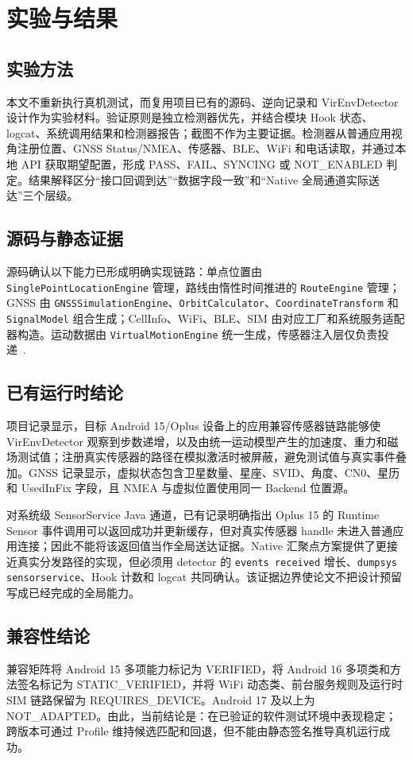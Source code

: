\section{实验与结果}
\subsection{实验方法}
本文不重新执行真机测试，而复用项目已有的源码、逆向记录和 VirEnvDetector~\citep{virenvdetector} 设计作为实验材料。验证原则是独立检测器优先，并结合模块 Hook 状态、logcat、系统调用结果和检测器报告；截图不作为主要证据。检测器从普通应用视角注册位置、GNSS Status/NMEA、传感器、BLE、WiFi 和电话读取，并通过本地 API 获取期望配置，形成 PASS、FAIL、SYNCING 或 NOT\_ENABLED 判定。结果解释区分“接口回调到达”“数据字段一致”和“Native 全局通道实际送达”三个层级。

\subsection{源码与静态证据}
源码确认以下能力已形成明确实现链路：单点位置由 \texttt{SinglePointLocationEngine} 管理，路线由惰性时间推进的 \texttt{RouteEngine} 管理；GNSS 由 \texttt{GNSSSimulationEngine}、\texttt{OrbitCalculator}、\texttt{CoordinateTransform} 和 \texttt{SignalModel} 组合生成；CellInfo、WiFi、BLE、SIM 由对应工厂和系统服务适配器构造。运动数据由 \texttt{VirtualMotionEngine} 统一生成，传感器注入层仅负责投递~\citep{zhangvirtualenv}.

\subsection{已有运行时结论}
项目记录显示，目标 Android 15/Oplus 设备上的应用兼容传感器链路能够使 VirEnvDetector 观察到步数递增，以及由统一运动模型产生的加速度、重力和磁场测试值；注册真实传感器的路径在模拟激活时被屏蔽，避免测试值与真实事件叠加。GNSS 记录显示，虚拟状态包含卫星数量、星座、SVID、角度、CN0、星历和 UsedInFix 字段，且 NMEA 与虚拟位置使用同一 Backend 位置源。

对系统级 SensorService Java 通道，已有记录明确指出 Oplus 15 的 Runtime Sensor 事件调用可以返回成功并更新缓存，但对真实传感器 handle 未进入普通应用连接；因此不能将该返回值当作全局送达证据。Native 汇聚点方案提供了更接近真实分发路径的实现，但必须用 detector 的 \texttt{events received} 增长、\texttt{dumpsys sensorservice}、Hook 计数和 logcat 共同确认。该证据边界使论文不把设计预留写成已经完成的全局能力。

\subsection{兼容性结论}
兼容矩阵将 Android 15 多项能力标记为 VERIFIED，将 Android 16 多项类和方法签名标记为 STATIC\_VERIFIED，并将 WiFi 动态类、前台服务规则及运行时 SIM 链路保留为 REQUIRES\_DEVICE。Android 17 及以上为 NOT\_ADAPTED。由此，当前结论是：在已验证的软件测试环境中表现稳定；跨版本可通过 Profile 维持候选匹配和回退，但不能由静态签名推导真机运行成功。
